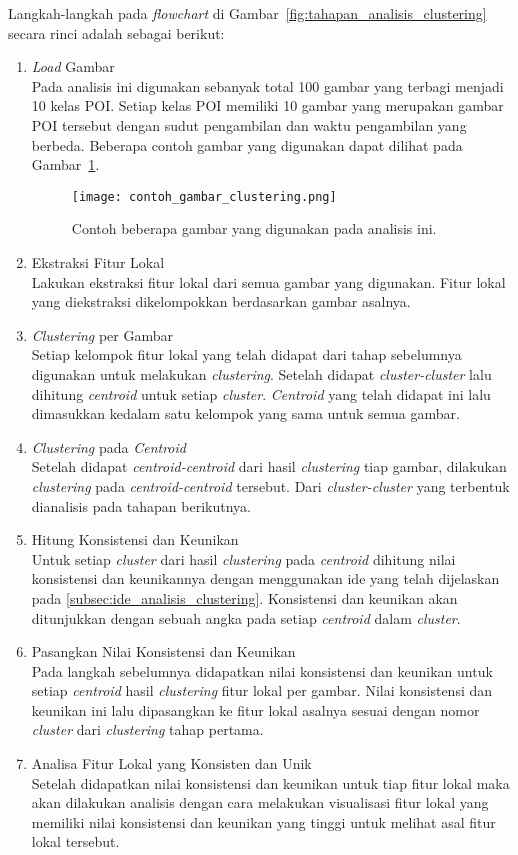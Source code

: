 Langkah-langkah pada \textit{flowchart} di Gambar~\ref{fig:tahapan_analisis_clustering} secara rinci adalah sebagai berikut:
\begin{enumerate}
	\item \textit{Load} Gambar \\
	Pada analisis ini digunakan sebanyak total 100 gambar yang terbagi menjadi 10 kelas POI. Setiap kelas POI memiliki 10 gambar yang merupakan gambar POI tersebut dengan sudut pengambilan dan waktu pengambilan yang berbeda. Beberapa contoh gambar yang digunakan dapat dilihat pada Gambar~\ref{fig:gambar_analisis_clustering}.
	\begin{figure}[H]
		\centering
		\texttt{[image: contoh\_gambar\_clustering.png]}
		\caption{Contoh beberapa gambar yang digunakan pada analisis ini.}
		\label{fig:gambar_analisis_clustering}
	\end{figure}
	\item Ekstraksi Fitur Lokal \\
	Lakukan ekstraksi fitur lokal dari semua gambar yang digunakan. Fitur lokal yang diekstraksi dikelompokkan berdasarkan gambar asalnya.
	\item \textit{Clustering} per Gambar \\
	Setiap kelompok fitur lokal yang telah didapat dari tahap sebelumnya digunakan untuk melakukan \textit{clustering}. Setelah didapat \textit{cluster-cluster} lalu dihitung \textit{centroid} untuk setiap \textit{cluster}. \textit{Centroid} yang telah didapat ini lalu dimasukkan kedalam satu kelompok yang sama untuk semua gambar.
	\item \textit{Clustering} pada \textit{Centroid} \\
	Setelah didapat \textit{centroid-centroid} dari hasil \textit{clustering} tiap gambar, dilakukan \textit{clustering} pada \textit{centroid-centroid} tersebut. Dari \textit{cluster-cluster} yang terbentuk dianalisis pada tahapan berikutnya.
	\item Hitung Konsistensi dan Keunikan \\
	Untuk setiap \textit{cluster} dari hasil \textit{clustering} pada \textit{centroid} dihitung nilai konsistensi dan keunikannya dengan menggunakan ide yang telah dijelaskan pada \ref{subsec:ide_analisis_clustering}. Konsistensi dan keunikan akan ditunjukkan dengan sebuah angka pada setiap \textit{centroid} dalam \textit{cluster}.
	\item Pasangkan Nilai Konsistensi dan Keunikan \\
	Pada langkah sebelumnya didapatkan nilai konsistensi dan keunikan untuk setiap \textit{centroid} hasil \textit{clustering} fitur lokal per gambar. Nilai konsistensi dan keunikan ini lalu dipasangkan ke fitur lokal asalnya sesuai dengan nomor \textit{cluster} dari \textit{clustering} tahap pertama.
	\item Analisa Fitur Lokal yang Konsisten dan Unik \\
	Setelah didapatkan nilai konsistensi dan keunikan untuk tiap fitur lokal maka akan dilakukan analisis dengan cara melakukan visualisasi fitur lokal yang memiliki nilai konsistensi dan keunikan yang tinggi untuk melihat asal fitur lokal tersebut.
\end{enumerate}

